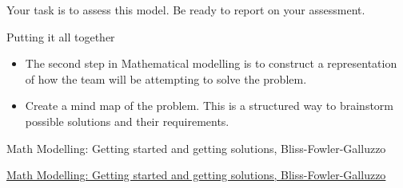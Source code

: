 Your task is to assess this model.
Be ready to report on your assessment.



















\standardonlynewpage


%
%



\begin{module}{Putting it all together}
	\label{report}

	
	
\end{module}



\begin{lesson}

	\begin{itemize}
		\item The second step in Mathematical modelling is to construct a representation of how the team will be attempting to solve the problem.
		\item Create a mind map of the problem. This is a structured way to brainstorm possible solutions and their requirements.
	\end{itemize}
	

\begin{annotation}
	\begin{goals}
	Math Modelling: Getting started and getting solutions, Bliss-Fowler-Galluzzo
	
	\hfill {}	
	\end{goals}
\end{annotation}
	 \href{https://m3challenge.siam.org/resources/modeling-handbook}{Math Modelling: Getting started and getting solutions, Bliss-Fowler-Galluzzo}

\end{lesson}







